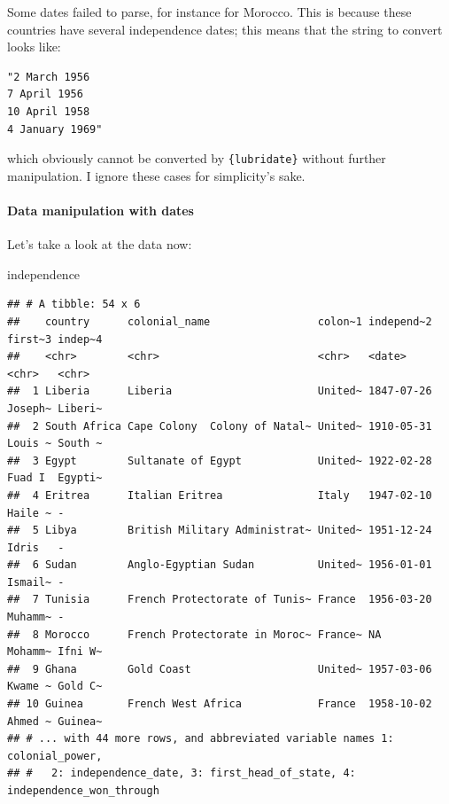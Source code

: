 \documentclass[
]{article}
\newenvironment{Shaded}{\begin{snugshade}}{\end{snugshade}}
\newcommand{\NormalTok}[1]{#1}
\begin{document}
Some dates failed to parse, for instance for Morocco. This is because these countries have several
independence dates; this means that the string to convert looks like:

\begin{verbatim}
"2 March 1956
7 April 1956
10 April 1958
4 January 1969"
\end{verbatim}

which obviously cannot be converted by \texttt{\{lubridate\}} without further manipulation. I ignore these cases for
simplicity's sake.

\hypertarget{data-manipulation-with-dates}{%
\paragraph{Data manipulation with dates}\label{data-manipulation-with-dates}}

Let's take a look at the data now:

\begin{Shaded}
\begin{Highlighting}[]
\NormalTok{independence}
\end{Highlighting}
\end{Shaded}

\begin{verbatim}
## # A tibble: 54 x 6
##    country      colonial_name                 colon~1 independ~2 first~3 indep~4
##    <chr>        <chr>                         <chr>   <date>     <chr>   <chr>  
##  1 Liberia      Liberia                       United~ 1847-07-26 Joseph~ Liberi~
##  2 South Africa Cape Colony  Colony of Natal~ United~ 1910-05-31 Louis ~ South ~
##  3 Egypt        Sultanate of Egypt            United~ 1922-02-28 Fuad I  Egypti~
##  4 Eritrea      Italian Eritrea               Italy   1947-02-10 Haile ~ -      
##  5 Libya        British Military Administrat~ United~ 1951-12-24 Idris   -      
##  6 Sudan        Anglo-Egyptian Sudan          United~ 1956-01-01 Ismail~ -      
##  7 Tunisia      French Protectorate of Tunis~ France  1956-03-20 Muhamm~ -      
##  8 Morocco      French Protectorate in Moroc~ France~ NA         Mohamm~ Ifni W~
##  9 Ghana        Gold Coast                    United~ 1957-03-06 Kwame ~ Gold C~
## 10 Guinea       French West Africa            France  1958-10-02 Ahmed ~ Guinea~
## # ... with 44 more rows, and abbreviated variable names 1: colonial_power,
## #   2: independence_date, 3: first_head_of_state, 4: independence_won_through
\end{verbatim}
\end{document}
